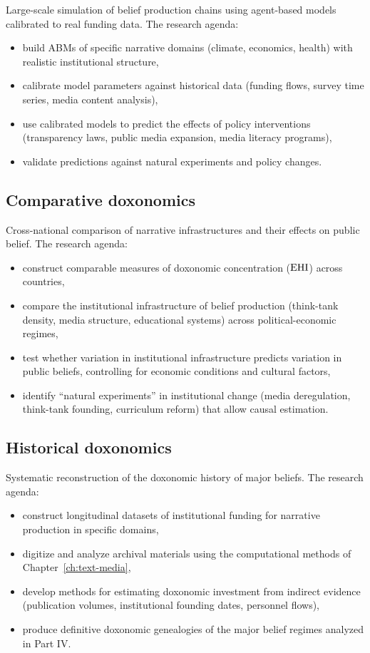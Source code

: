 Large-scale simulation of belief production chains using agent-based models calibrated to real funding data.
The research agenda:
\begin{itemize}[nosep]
  \item build ABMs of specific narrative domains (climate, economics, health) with realistic institutional structure,
  \item calibrate model parameters against historical data (funding flows, survey time series, media content analysis),
  \item use calibrated models to predict the effects of policy interventions (transparency laws, public media expansion, media literacy programs),
  \item validate predictions against natural experiments and policy changes.
\end{itemize}

\subsection{Comparative doxonomics}

Cross-national comparison of narrative infrastructures and their effects on public belief.
The research agenda:
\begin{itemize}[nosep]
  \item construct comparable measures of doxonomic concentration ($\mathrm{EHI}$) across countries,
  \item compare the institutional infrastructure of belief production (think-tank density, media structure, educational systems) across political-economic regimes,
  \item test whether variation in institutional infrastructure predicts variation in public beliefs, controlling for economic conditions and cultural factors,
  \item identify ``natural experiments'' in institutional change (media deregulation, think-tank founding, curriculum reform) that allow causal estimation.
\end{itemize}

\subsection{Historical doxonomics}

Systematic reconstruction of the doxonomic history of major beliefs.
The research agenda:
\begin{itemize}[nosep]
  \item construct longitudinal datasets of institutional funding for narrative production in specific domains,
  \item digitize and analyze archival materials using the computational methods of Chapter~\ref{ch:text-media},
  \item develop methods for estimating doxonomic investment from indirect evidence (publication volumes, institutional founding dates, personnel flows),
  \item produce definitive doxonomic genealogies of the major belief regimes analyzed in Part IV.
\end{itemize}

